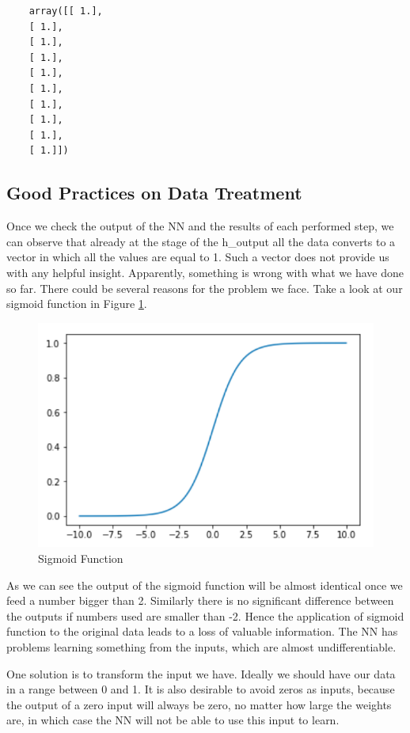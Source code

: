 \begin{lstlisting}
    array([[ 1.],
    [ 1.],
    [ 1.],
    [ 1.],
    [ 1.],
    [ 1.],
    [ 1.],
    [ 1.],
    [ 1.],
    [ 1.]])
\end{lstlisting}

\subsection{Good Practices on Data Treatment}

Once we check the output of the NN and the results of each performed step, we can observe that already at the stage of the h\_output all the data converts to a vector in which all the values are equal to 1. Such a vector does not provide us with any helpful insight. Apparently, something is wrong with what we have done so far. There could be several reasons for the problem we face. Take a look at our sigmoid function in Figure \ref{fig:sigmoid-fct}.

\begin{figure}[H]
    \includegraphics[width=\linewidth]{pics/sigmoid.png}
    \caption{\label{fig:sigmoid-fct} Sigmoid Function}
\end{figure}

As we can see the output of the sigmoid function will be almost identical once we feed a number bigger than 2. Similarly there is no significant difference between the outputs if numbers used are smaller than -2. Hence the application of sigmoid function to the original data leads to a loss of valuable information. The NN has problems learning something from the inputs, which are almost undifferentiable.  

One solution is to transform the input we have. Ideally we should have our data in a range between 0 and 1. It is also desirable to avoid zeros as inputs, because the output of a zero input will always be zero, no matter how large the weights are, in which case the NN will not be able to use this input to learn.

